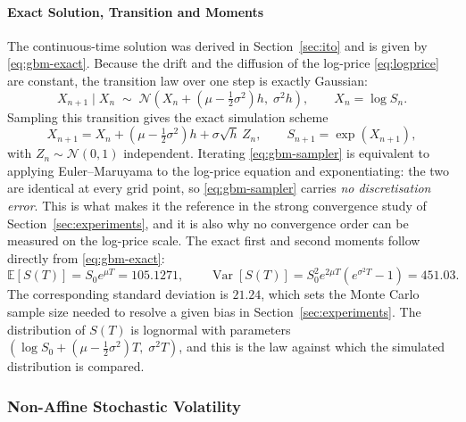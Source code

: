 \documentclass[11pt,a4paper]{article}
\theoremstyle{definition}
\theoremstyle{remark}
\begin{document}
\paragraph{Exact Solution, Transition and Moments}
The continuous-time solution was derived in Section~\ref{sec:ito} and is given by \eqref{eq:gbm-exact}. Because the drift and the diffusion of the log-price \eqref{eq:logprice} are constant, the transition law over one step is exactly Gaussian:
\begin{equation}
    X_{n+1} \mid X_n \;\sim\; \mathcal{N}\!\left( X_n + \left( \mu - \tfrac12 \sigma^2 \right) h,\; \sigma^2 h \right),
    \qquad X_n = \log S_n .
    \label{eq:gbm-transition}
\end{equation}
Sampling this transition gives the exact simulation scheme
\begin{equation}
    X_{n+1} = X_n + \left( \mu - \tfrac12 \sigma^2 \right) h + \sigma \sqrt{h}\, Z_n,
    \qquad
    S_{n+1} = \exp\left( X_{n+1} \right),
    \label{eq:gbm-sampler}
\end{equation}
with $Z_n \sim \mathcal{N}(0,1)$ independent. Iterating \eqref{eq:gbm-sampler} is equivalent to applying Euler--Maruyama to the log-price equation and exponentiating: the two are identical at every grid point, so \eqref{eq:gbm-sampler} carries \emph{no discretisation error}. This is what makes it the reference in the strong convergence study of Section~\ref{sec:experiments}, and it is also why no convergence order can be measured on the log-price scale.
The exact first and second moments follow directly from \eqref{eq:gbm-exact}:
\begin{equation}
    \mathbb{E}[S(T)] = S_0 e^{\mu T} = 105.1271,
    \qquad
    \operatorname{Var}[S(T)] = S_0^2 e^{2\mu T} \left( e^{\sigma^2 T} - 1 \right) = 451.03 .
    \label{eq:gbm-moments}
\end{equation}
The corresponding standard deviation is $21.24$, which sets the Monte Carlo sample size needed to resolve a given bias in Section~\ref{sec:experiments}. The distribution of $S(T)$ is lognormal with parameters $\left( \log S_0 + \left( \mu - \tfrac12\sigma^2 \right) T,\; \sigma^2 T \right)$, and this is the law against which the simulated distribution is compared.
\subsubsection{Non-Affine Stochastic Volatility}
\label{sec:nasv-model}
\end{document}
